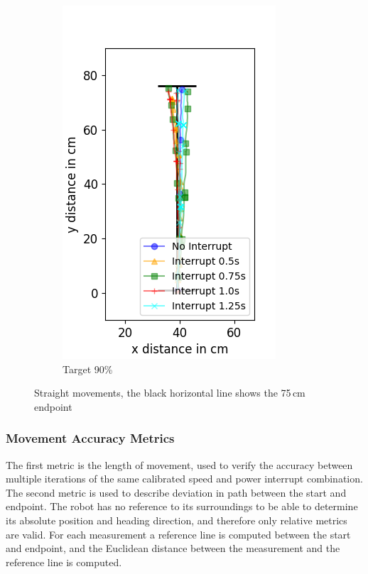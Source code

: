 \begin{figure}
\begin{subfigure}[b]{0.32\textwidth}
		\includegraphics[width=\textwidth]{pics/straight_90.png}
		\caption{Target 90\%}
		\label{fig:stra_exp3}
	\end{subfigure}
	\caption{Straight movements, the black horizontal line shows the 75\,cm endpoint}
	\label{fig:straight_movements}
\end{figure}

\subsubsection{Movement Accuracy Metrics}

The first metric is the length of movement, used to verify the accuracy between multiple iterations of the same calibrated speed and power interrupt combination.
The second metric is used to describe deviation in path between the start and endpoint.
The robot has no reference to its surroundings to be able to determine its absolute position and heading direction, and therefore only relative metrics are valid.
For each measurement a reference line is computed between the start and endpoint, and the Euclidean distance between the measurement and the reference line is computed.

